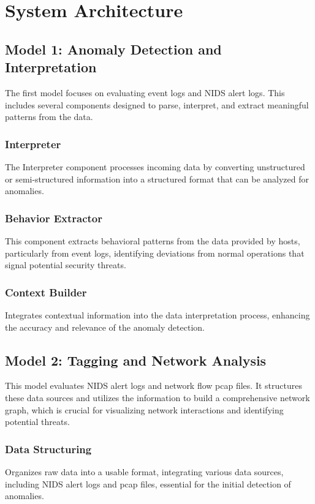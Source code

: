 \section{System Architecture}




\subsection{Model 1: Anomaly Detection and Interpretation}
The first model focuses on evaluating event logs and NIDS alert logs. This includes several components designed to parse, interpret, and extract meaningful patterns from the data.

\subsubsection{Interpreter}
The Interpreter component processes incoming data by converting unstructured or semi-structured information into a structured format that can be analyzed for anomalies.

\subsubsection{Behavior Extractor}
This component extracts behavioral patterns from the data provided by hosts, particularly from event logs, identifying deviations from normal operations that signal potential security threats.

\subsubsection{Context Builder}
Integrates contextual information into the data interpretation process, enhancing the accuracy and relevance of the anomaly detection.

\subsection{Model 2: Tagging and Network Analysis}
This model evaluates NIDS alert logs and network flow pcap files. It structures these data sources and utilizes the information to build a comprehensive network graph, which is crucial for visualizing network interactions and identifying potential threats.

\subsubsection{Data Structuring}
Organizes raw data into a usable format, integrating various data sources, including NIDS alert logs and pcap files, essential for the initial detection of anomalies.

